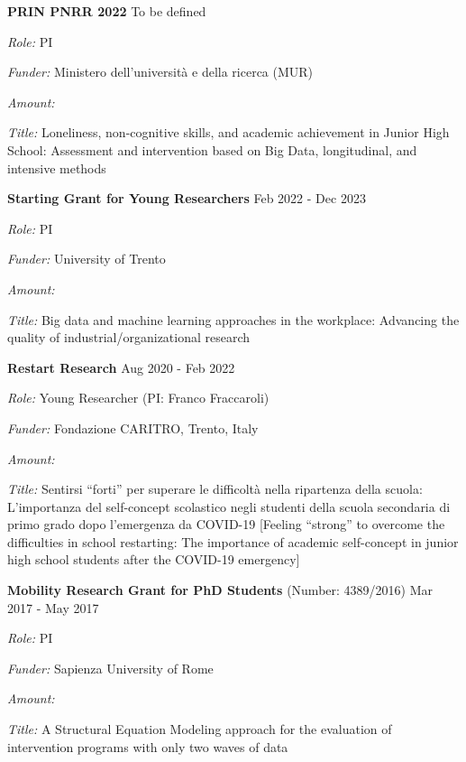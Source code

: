 \documentclass[hidelinks, letterpaper,10pt]{article} %
\begin{document}
	
	\begin{center}
		\parbox{6.5in}{{\textbf{PRIN PNRR 2022}}   \hspace{11cm} To be defined}
		\parbox{6.5in}{\textit{Role:} PI}
		\parbox{6.5in}{\textit{Funder:} Ministero dell'università e della ricerca (MUR)}
	    \parbox{6.5in}{\textit{Amount:} } 
	    \parbox{6.5in}{\textit{Title:} Loneliness, non-cognitive skills, and academic achievement in Junior High School: Assessment and intervention based on Big Data, longitudinal, and intensive methods}
	    \vspace{3mm}
	\end{center}


	\begin{center}
		\parbox{6.5in}{{\textbf{Starting Grant for Young Researchers}}   \hspace{6.5cm} Feb 2022 - Dec 2023}
		\parbox{6.5in}{\textit{Role:} PI}
		\parbox{6.5in}{\textit{Funder:} University of Trento}
	    \parbox{6.5in}{\textit{Amount:} } 
	    \parbox{6.5in}{\textit{Title:} Big data and machine learning approaches in the workplace: Advancing the quality of industrial/organizational research}
	    \vspace{3mm}
	\end{center}

	\begin{center}
		\parbox{6.5in}{{\textbf{Restart Research}}   \hspace{10cm} Aug 2020 - Feb 2022}
		\parbox{6.5in}{\textit{Role:} Young Researcher (PI: Franco Fraccaroli)}
		\parbox{6.5in}{\textit{Funder:} Fondazione CARITRO, Trento, Italy}
	    \parbox{6.5in}{\textit{Amount:} } 
	    \parbox{6.5in}{\textit{Title:} Sentirsi “forti” per superare le difficoltà nella ripartenza della scuola: L’importanza del self-concept scolastico negli studenti della scuola secondaria di primo grado dopo l’emergenza da COVID-19 [Feeling “strong” to overcome the difficulties in school restarting: The importance of academic self-concept in junior high school students after the COVID-19 emergency]}
	    \vspace{3mm}
	\end{center}
	
	\begin{center}
		\parbox{6.5in}{{\textbf{Mobility Research Grant for PhD Students} (Number: 4389/2016)}   \hspace{2cm} Mar 2017 - May 2017}
		\parbox{6.5in}{\textit{Role:} PI}
		\parbox{6.5in}{\textit{Funder:} Sapienza University of Rome}
		\parbox{6.5in}{\textit{Amount:} }
		\parbox{6.5in}{\textit{Title:} A Structural Equation Modeling approach for the evaluation of intervention programs with only two waves of data}
		\vspace{3mm}
	\end{center}
	
\end{document}
